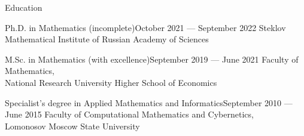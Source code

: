 \documentclass{resume}
\begin{document}
\begin{rSection}{Education}
\begin{rSubsection}{Ph.D. in Mathematics (incomplete)}{October 2021 --- September 2022}{}
  Steklov Mathematical Institute of Russian Academy of Sciences\vspace{0.5em}
\end{rSubsection}

\begin{rSubsection}{M.Sc. in Mathematics (with excellence)}{September 2019 --- June 2021}{}
  Faculty of Mathematics, \\
  National Research University Higher School of Economics
\end{rSubsection}

\begin{rSubsection}{Specialist's degree in Applied Mathematics and Informatics}{September 2010 --- June 2015}{}
  Faculty of Computational Mathematics and Cybernetics, \\
  Lomonosov Moscow State University
\end{rSubsection}
\end{rSection}
\end{document}
